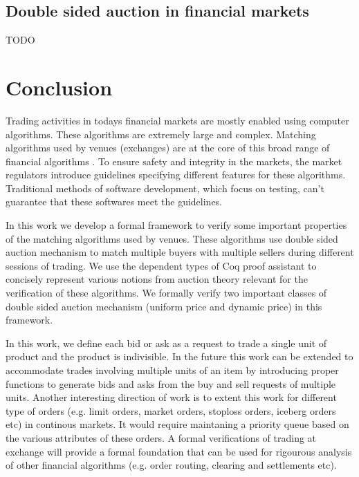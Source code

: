 \documentclass[a4paper,UKenglish,cleveref, autoref]{lipics-v2019}
\begin{document}
\subsection{Double sided auction in financial markets}
TODO

\section{Conclusion}\label{sec:conclusion}
Trading activities in todays financial markets are mostly enabled using computer algorithms. These algorithms are extremely large and complex. Matching algorithms used by venues (exchanges) are at the core of this broad range of financial algorithms \cite{PassmoreI17}. To ensure safety and integrity in the markets, the market regulators introduce guidelines specifying different features for these algorithms. Traditional methods of software development, which focus on testing,  can’t guarantee that these softwares meet the guidelines. 

In this work we develop a formal framework to verify some important  properties of the matching algorithms used by venues. These algorithms use double sided auction mechanism to match multiple buyers with multiple sellers during different sessions of trading. We use the dependent types of Coq proof assistant to concisely represent various notions from auction theory relevant for the verification of these algorithms. We formally verify two important classes of double sided auction mechanism (uniform price and dynamic price) in this framework. 

In this work, we define each bid or ask as a request to trade a single unit of product and the product is indivisible. In the future this work can be
extended to accommodate trades involving multiple units of an item by introducing proper functions to generate bids and asks from the buy and sell requests of multiple units. Another interesting direction of work is to extent this work for different type of orders (e.g. limit orders, market orders, stoploss orders, iceberg orders etc) in continous markets. It would require maintaning a priority queue based on the various attributes of these orders. A formal verifications of trading at exchange will provide a formal foundation that can be used for rigourous analysis of other financial algorithms (e.g. order routing, clearing and settlements etc).



\end{document}
